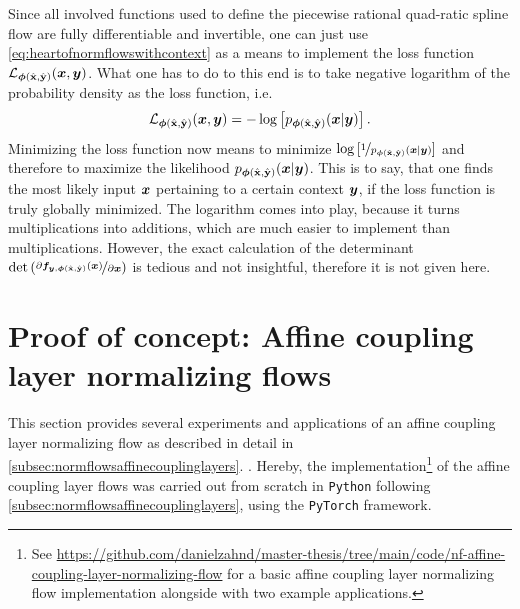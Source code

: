 \documentclass[a4paper,12pt]{report}
\def\lk#1{{\color{black}{#1}}}
\begin{document}
Since all involved functions used to define the piecewise rational quad-ratic spline flow are fully differentiable and invertible, one can just use \cref{eq:heartofnormflowswithcontext} as a means to implement the loss function $\mathcal{L}_{\bm{\phi}(\hat{\boldsymbol{\mathbf{x}}},\hat{\boldsymbol{\mathbf{y}}})}(\bm{x},\bm{y})$. What one has to do to this end is to take negative logarithm of the probability density \lk{$p_{\vect{\phi}(\hat{\matr{x}},\hat{\matr{y}})}(\vect{x}|\vect{y})$} as the loss function, i.e. \begin{equation}
\mathcal{L}_{\bm{\phi}(\hat{\boldsymbol{\mathbf{x}}},\hat{\boldsymbol{\mathbf{y}}})}(\bm{x},\bm{y}) = -\log\left[p_{\bm{\phi}(\hat{\boldsymbol{\mathbf{x}}},\hat{\boldsymbol{\mathbf{y}}})}(\bm{x}|\bm{y})\right].
\end{equation} Minimizing the loss function now means to minimize $\log\left[\nicefrac{1 }{p_{\bm{\phi}(\hat{\boldsymbol{\mathbf{x}}},\hat{\boldsymbol{\mathbf{y}}})}(\bm{x}|\bm{y})}\right]$ and therefore to maximize the likelihood $p_{\vect{\phi}(\hat{\matr{x}},\hat{\matr{y}})}(\vect{x}|\vect{y})$. This is to say, that one finds the most likely input $\bm{x}$ pertaining to a certain context $\bm{y}$, if the loss function is truly globally minimized. The logarithm comes into play, because it turns multiplications into additions, which are much easier to implement than multiplications. However, the exact calculation of the determinant $\det\left(\nicefrac{\partial \bm{f}_{\bm{y},\bm{\phi}(\hat{\boldsymbol{\mathbf{x}}},\hat{\boldsymbol{\mathbf{y}}})}(\bm{x})}{\partial \bm{x}}\right)$ is tedious and not insightful, therefore it is not given here.

\chapter{Proof of concept: Affine coupling layer normalizing flows}\label{chap:proofofconcept}
This section provides several experiments and applications of an affine coupling layer normalizing flow as described in detail in \cref{subsec:normflowsaffinecouplinglayers}. \lk{These experiments are intended to serve as a proof of concept to demonstrate the applicability of normalizing flows to tasks of increasing complexity}. Hereby, the implementation\footnote{See \url{https://github.com/danielzahnd/master-thesis/tree/main/code/nf-affine-coupling-layer-normalizing-flow} for a basic affine coupling layer normalizing flow implementation alongside with two example applications.} of the affine coupling layer flows was carried out from scratch in \verb|Python| following \cref{subsec:normflowsaffinecouplinglayers}, using the \verb|PyTorch| framework.
\end{document}
